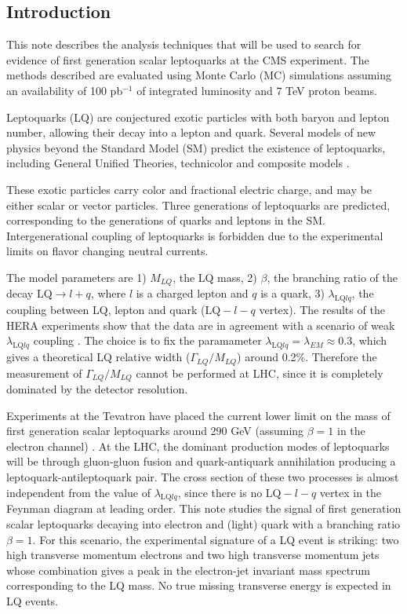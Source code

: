 \documentclass[colclass=cmspaper]{combine}
\begin{document}
\begin{linenumbers}
\setcounter{page}{2}%

\section{Introduction}

This note describes the analysis techniques that will be used to search for evidence of first generation scalar leptoquarks 
at the CMS experiment. The methods described are evaluated using Monte Carlo (MC) simulations assuming an availability of 
100 pb$^{-1}$ of integrated luminosity and 7 TeV proton beams.

Leptoquarks (LQ) are conjectured exotic particles with both baryon and lepton number, allowing their decay into a lepton and quark.    
Several models of new physics beyond the Standard Model (SM) predict the existence of leptoquarks, including General Unified Theories, 
technicolor and composite models \cite{theories}.  

These exotic particles carry color and fractional electric 
charge, and may be either scalar or vector particles. Three generations of leptoquarks are predicted, 
corresponding to the generations of quarks and leptons in the SM.  Intergenerational coupling of leptoquarks is forbidden 
due to the experimental limits on flavor changing neutral currents. 

The model parameters are 1) $M_{LQ}$, the LQ mass, 2) $\beta$, the branching ratio of the decay 
$\mbox{LQ} \rightarrow l + q$, where $l$ is a charged lepton and $q$ is a quark, 
3) $\lambda_{\mbox{LQ}lq}$, the coupling between LQ, lepton and quark ($\mbox{LQ}-l-q$ vertex). 
The results of the HERA experiments show that the data are in agreement with a scenario of weak 
$\lambda_{\mbox{LQ}lq}$ coupling \cite{hera}. The choice is to fix the paramameter 
$\lambda_{\mbox{LQ}lq} = \lambda_{EM} \approx 0.3$, which gives 
a theoretical LQ relative width ($\Gamma_{LQ}/M_{LQ}$) around 0.2\%. 
Therefore the measurement of $\Gamma_{LQ}/M_{LQ}$ cannot be performed at LHC, since 
it is completely dominated by the detector resolution.  

Experiments at the Tevatron have placed the current lower limit on the mass of first generation scalar 
leptoquarks around 290 GeV (assuming $\beta=1$ in the electron channel) \cite{d02008}.
At the LHC, the dominant production modes of leptoquarks will be through gluon-gluon fusion and 
quark-antiquark annihilation producing a leptoquark-antileptoquark pair. 
The cross section of these two processes is almost independent from the value of 
$\lambda_{\mbox{LQ}lq}$, since there is no $\mbox{LQ}-l-q$ vertex in the Feynman diagram 
at leading order. This note studies the signal of first generation scalar leptoquarks decaying into electron and 
(light) quark with a branching ratio $\beta=1$. 
For this scenario, the experimental signature of a LQ event is striking: two 
high transverse momentum electrons and two high transverse momentum jets 
whose combination gives a peak in the electron-jet invariant mass 
spectrum corresponding to the LQ mass. No true missing transverse energy is expected in LQ events.


\end{linenumbers}
\end{document}
